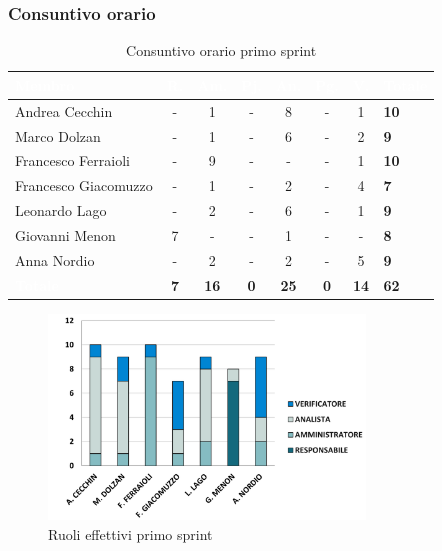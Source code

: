 \subsubsection{Consuntivo orario}
{
\setlength{\tabcolsep}{10pt}
\renewcommand{\arraystretch}{1.5}
\begin{table}[h!]
    \centering
    \begin{tabularx}{\textwidth}{| l | c | c | c | c | c | c | X |}
        \hline
        \rowcolor{headerrow} \textbf{\textcolor{white}{Membro}} & \textbf{\textcolor{white}{R.}} & \textbf{\textcolor{white}{Am.}} & \textbf{\textcolor{white}{Pj.}} & \textbf{\textcolor{white}{An.}} & \textbf{\textcolor{white}{Pg.}} & \textbf{\textcolor{white}{V.}} & \textbf{\textcolor{white}{Totale}} \\
        \hline
        Andrea Cecchin & - & 1 & - & 8 & - & 1 & \textbf{10} \\
        \hline
        Marco Dolzan & - & 1 & - & 6 & - & 2 & \textbf{9} \\
        \hline
        Francesco Ferraioli & - & 9 & - & - & - & 1 & \textbf{10} \\
        \hline  
        Francesco Giacomuzzo & - & 1 & - & 2 & - & 4 & \textbf{7} \\
        \hline
        Leonardo Lago & - & 2 & - & 6 & - & 1 & \textbf{9} \\
        \hline
        Giovanni Menon & 7 & - & - & 1 & - & - & \textbf{8} \\
        \hline
        Anna Nordio & - & 2 & - & 2 & - & 5 & \textbf{9} \\
        \hline
    \cellcolor{headerrow} \textbf{\textcolor{white}{Totale}} & \textbf{7} & \textbf{16} & \textbf{0} & \textbf{25} & \textbf{0} & \textbf{14} & \textbf{62} \\
        \hline
    \end{tabularx} 
    \caption{Consuntivo orario primo sprint}
    \label{tab:consuntivoorarioprimosprint}
\end{table}
}

\begin{figure}[h!]
    \centering
    \includegraphics[width=0.75\textwidth]{cons1ruoli.png}
    \caption{Ruoli effettivi primo sprint}
    \label{fig:consuntivoorarioprimosprint}
\end{figure}

